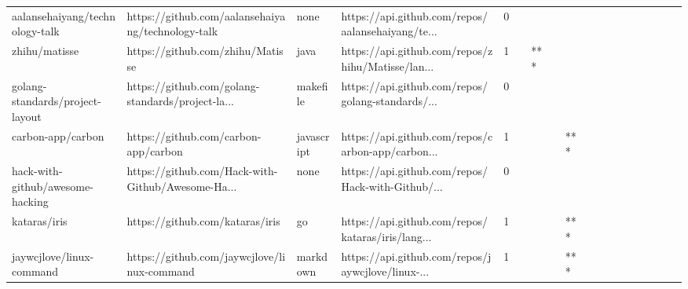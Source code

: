 \begin{tabular}{llllrlllllllllllll}
aalansehaiyang/technology-talk                     &  https://github.com/aalansehaiyang/technology-talk &              none &  https://api.github.com/repos/aalansehaiyang/te... &       0 &         &        &           &                &                 &        &           &           &          &          &       &              &          \\
zhihu/matisse                                      &                   https://github.com/zhihu/Matisse &              java &  https://api.github.com/repos/zhihu/Matisse/lan... &       1 &         &    *** &           &                &                 &        &           &           &          &          &       &              &          \\
golang-standards/project-layout                    &  https://github.com/golang-standards/project-la... &          makefile &  https://api.github.com/repos/golang-standards/... &       0 &         &        &           &                &                 &        &           &           &          &          &       &              &          \\
carbon-app/carbon                                  &               https://github.com/carbon-app/carbon &        javascript &  https://api.github.com/repos/carbon-app/carbon... &       1 &         &        &           &            *** &                 &        &           &           &          &          &       &              &          \\
hack-with-github/awesome-hacking                   &  https://github.com/Hack-with-Github/Awesome-Ha... &              none &  https://api.github.com/repos/Hack-with-Github/... &       0 &         &        &           &                &                 &        &           &           &          &          &       &              &          \\
kataras/iris                                       &                    https://github.com/kataras/iris &                go &  https://api.github.com/repos/kataras/iris/lang... &       1 &         &        &           &            *** &                 &        &           &           &          &          &       &              &          \\
jaywcjlove/linux-command                           &        https://github.com/jaywcjlove/linux-command &          markdown &  https://api.github.com/repos/jaywcjlove/linux-... &       1 &         &        &           &            *** &                 &        &           &           &          &          &       &              &          \\

\end{tabular}
